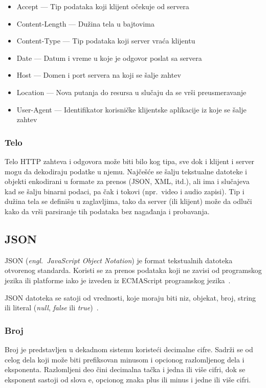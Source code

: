 \documentclass[12pt]{report}
\begin{document}
\begin{itemize}
    \item Accept --- Tip podataka koji klijent očekuje od servera
    \item Content-Length --- Dužina tela u bajtovima
    \item Content-Type --- Tip podataka koji server vraća klijentu
    \item Date --- Datum i vreme u koje je odgovor poslat sa servera
    \item Host --- Domen i port servera na koji se šalje zahtev
    \item Location --- Nova putanja do resursa u slučaju da se vrši preusmeravanje
    \item User-Agent --- Identifikator korisničke klijentske aplikacije iz koje se šalje zahtev
\end{itemize}

\subsubsection{Telo}
Telo \acrshort{HTTP} zahteva i odgovora može biti bilo kog tipa, sve dok i klijent i server mogu da dekodiraju podatke u njemu. Najčešće se šalju tekstualne datoteke i objekti enkodirani u formate za prenos (\acrshort{JSON}, XML, itd.), ali ima i slučajeva kad se šalju binarni podaci, pa čak i tokovi (npr.\, video i audio zapisi). Tip i dužina tela se definišu u zaglavljima, tako da server (ili klijent) može da odluči kako da vrši parsiranje tih podataka bez nagađanja i probavanja.

\subsection{JSON}
\acrshort{JSON} (\textit{engl.\ JavaScript Object Notation}) je format tekstualnih datoteka otvorenog standarda. Koristi se za prenos podataka koji ne zavisi od programskog jezika ili platforme iako je izveden iz ECMAScript programskog jezika~\cite{ecmascript}.

\acrshort{JSON} datoteka se satoji od vrednosti, koje moraju biti niz, objekat, broj, string ili literal (\textit{null}, \textit{false} ili \textit{true})~\cite{json}.

\subsubsection{Broj}
Broj je predstavljen u dekadnom sistemu koristeći decimalne cifre. Sadrži se od celog dela koji može biti prefiksovan minusom i opcionog razlomljenog dela i eksponenta. Razlomljeni deo čini decimalna tačka i jedna ili više cifri, dok se eksponent sastoji od slova e, opcionog znaka plus ili minus i jedne ili više cifri.
\end{document}
